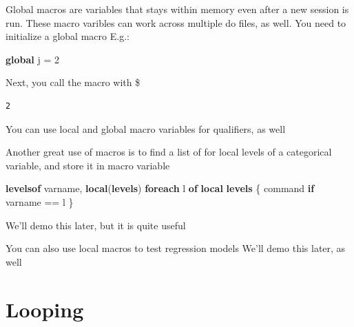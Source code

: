\documentclass[
]{book}
\newenvironment{Shaded}{\begin{snugshade}}{\end{snugshade}}
\newcommand{\FunctionTok}[1]{\textcolor[rgb]{0.13,0.29,0.53}{\textbf{#1}}}
\newcommand{\KeywordTok}[1]{\textcolor[rgb]{0.13,0.29,0.53}{\textbf{#1}}}
\newcommand{\NormalTok}[1]{#1}
\newcommand{\OtherTok}[1]{\textcolor[rgb]{0.56,0.35,0.01}{#1}}
\newcommand{\StringTok}[1]{\textcolor[rgb]{0.31,0.60,0.02}{#1}}
\begin{document}
Global macros are variables that stays within memory even after a new session is run. These macro varibles can work across multiple do files, as well. You need to initialize a global macro E.g.:

\begin{Shaded}
\begin{Highlighting}[]
\KeywordTok{global}\NormalTok{ j = 2}
\end{Highlighting}
\end{Shaded}

Next, you call the macro with \$

\begin{Shaded}
\end{Shaded}

\begin{verbatim}
2
\end{verbatim}

You can use local and global macro variables for qualifiers, as well

\begin{Shaded}
\end{Shaded}

Another great use of macros is to find a list of for local levels of a categorical variable, and store it in macro variable

\begin{Shaded}
\begin{Highlighting}[]
\KeywordTok{levelsof}\NormalTok{ varname, }\KeywordTok{local}\NormalTok{(}\KeywordTok{levels}\NormalTok{) }
\KeywordTok{foreach} \OtherTok{l} \KeywordTok{of} \KeywordTok{local} \KeywordTok{levels}\NormalTok{ \{}
\NormalTok{  command }\KeywordTok{if}\NormalTok{ varname == }\OtherTok{\textasciigrave{}l\textquotesingle{}}
\NormalTok{\}}
\end{Highlighting}
\end{Shaded}

We'll demo this later, but it is quite useful

You can also use local macros to test regression models
We'll demo this later, as well

\section{Looping}\label{looping}
\end{document}
